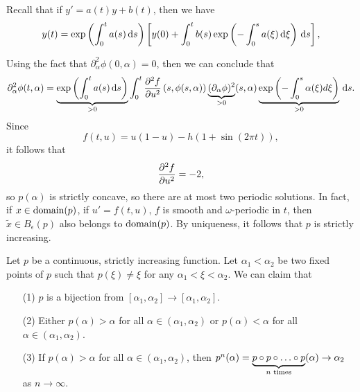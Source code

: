 \documentclass{article}
\begin{document}
    Recall that if $y' = a(t)y + b(t)$, then we have 
    \[
        y(t) = \exp \left(\int_0^t a(s) \, \text{d}s \right)\left[ y(0) + \int_0^t b(s) \exp \left(-\int_0^s a(\xi) \, \text{d} \xi \right) \, \text{d}s\right],
    \]

    Using the fact that $\partial_\alpha^2 \phi(0, \alpha) = 0$, then we can conclude that 
    \[
        \partial^2_\alpha \phi(t, \alpha) = \underbrace{\exp\left(\int_0^t a(s) \, \text{d}s \right)}_{> 0} \int_0^t \pdv[2]{f}{u} \, (s, \phi(s, \alpha)) \underbrace{(\partial_\alpha \phi)^2}_{> 0} (s, \alpha) \underbrace{\exp \left(-\int_0^s \alpha(\xi) d\xi \right)}_{> 0} \, \text{d}s.
    \]
    Since 
    \[
        f(t, u) = u(1 - u) - h(1 + \sin(2\pi t)),
    \]
    it follows that 
    \[
        \pdv[2]{f}{u} = -2,
    \]
    so $p(\alpha)$ is strictly concave, so there are at most two periodic solutions. In fact, if $x \in \text{domain}(p)$, if $u' = f(t, u)$, $f$ is smooth and $\omega$-periodic in $t$, then $\tilde x \in B_{\epsilon}(p)$ also belongs to $\text{domain}(p)$. By uniqueness, it follows that $p$ is strictly increasing.
    \newpar
    
    \begin{theorem}{}
        Let $p$ be a continuous, strictly increasing function. Let $\alpha_1 < \alpha_2$ be two fixed points of $p$ such that $p(\xi) \neq \xi$ for any $\alpha_1 < \xi < \alpha_2$. We can claim that
        \begin{itemize}
            \item[(1)] $p$ is a bijection from $[\alpha_1, \alpha_2] \to [\alpha_1, \alpha_2]$. 
            \item[(2)] Either $p(\alpha) > \alpha$ for all $\alpha \in (\alpha_1, \alpha_2)$ or $p(\alpha) < \alpha$ for all $\alpha \in (\alpha_1, \alpha_2)$. 
            \item[(3)] If $p(\alpha) > \alpha$ for all $\alpha \in (\alpha_1, \alpha_2)$, then $p^n (\alpha) = \underbrace{p \circ p \circ \hdots \circ p}_{n\text{ times}}(\alpha) \to \alpha_2$ as $n \to \infty$.  
        \end{itemize}
    \end{theorem}
\end{document}
